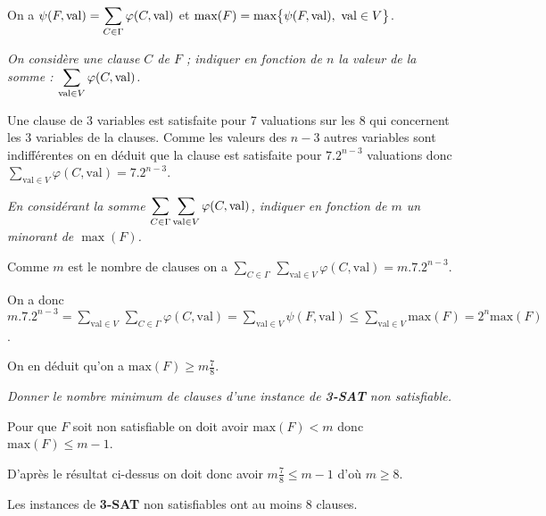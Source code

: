 On a $\displaystyle \psi ( F , \text{\rm val} ) = \sum_{C\in\Gamma}\varphi ( C , \text{\rm val} )$ et $\text{\rm max}(F) = \text{\rm max} \bigl\{\psi ( F , \text{\rm val} ),\ \text{\rm val} \in V\bigr\}$.
\begin{Exercise}\it
On considère une clause $C$ de $F$ ; indiquer en fonction de $n$ la valeur de la
somme : $\displaystyle \sum_{\text{\rm val}\in V}\varphi ( C , \text{\rm val} )$.
\end{Exercise}
\begin{Answer}

Une clause de 3 variables est satisfaite pour 7 valuations sur les 8 qui concernent les 3 variables de la clauses. Comme les valeurs des $n-3$ autres variables sont indifférentes on en déduit que la clause est satisfaite pour $7.2^{n-3}$ valuations donc
$\displaystyle \sum_{\text{val} \in V} \varphi(C,\text{val})=7.2^{n-3}$. 
\end{Answer}
\begin{Exercise}\it
En considérant la somme $\displaystyle \sum_{C\in\Gamma}\sum_{\text{\rm val}\in V}\varphi ( C , \text{\rm val} )$, indiquer en fonction de $m$ un minorant de $\max(F)$.
\end{Exercise}
\begin{Answer}

Comme $m$ est le nombre de clauses on a $\displaystyle \sum_{C\in\Gamma}\,\sum_{\text{val} \in V} \varphi(C,\text{val})=m.7.2^{n-3}$.

On a donc $\displaystyle m.7.2^{n-3} = \sum_{\text{val} \in V}\, \sum_{C\in\Gamma} \varphi(C,\text{val})
=\sum_{\text{val} \in V} \psi(F,\text{val}) \le \sum_{\text{val} \in V} \text{max}(F) = 2^n \text{max}(F)$.

On en déduit qu'on a $\displaystyle \text{max}(F) \ge m\frac 78$.
\end{Answer}
\begin{Exercise}\it
Donner le nombre minimum de clauses d’une instance de {\bf 3-SAT} non satisfiable.
\end{Exercise}
\begin{Answer}

Pour que $F$ soit non satisfiable on doit avoir $\text{max}(F) < m$ donc $\text{max}(F) \le m - 1$.

D'après le résultat ci-dessus on doit donc avoir $\displaystyle m\frac 78 \le m -1$ d'où  $m\ge 8$.

Les instances de {\bf 3-SAT} non satisfiables ont au moins 8 clauses.
\end{Answer}
